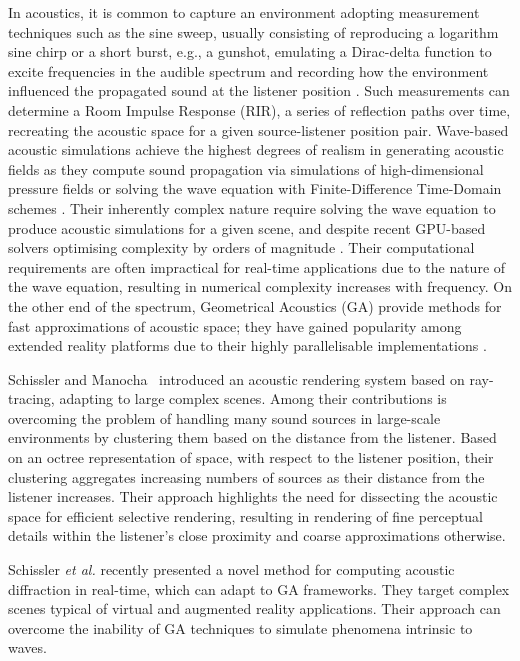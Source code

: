 In acoustics, it is common to capture an environment adopting measurement techniques such as the sine sweep, usually consisting of reproducing a logarithm sine chirp or a short burst, e.g., a gunshot,  emulating a Dirac-delta function to excite frequencies in the audible spectrum and recording how the environment influenced the propagated sound at the listener position \cite{reilly1995convolution}. Such measurements can determine a Room Impulse Response (RIR), a series of reflection paths over time, recreating the acoustic space for a given source-listener position pair. Wave-based acoustic simulations achieve the highest degrees of realism in generating acoustic fields as they compute sound propagation via simulations of high-dimensional pressure fields \cite{raghuvanshi2014parametric} or solving the wave equation with Finite-Difference Time-Domain schemes \cite{hamilton2017fdtd}. Their inherently complex nature require solving the wave equation to produce acoustic simulations for a given scene, and despite recent GPU-based solvers optimising complexity by orders of magnitude \cite{mehra2012efficient}. Their computational requirements are often impractical for real-time applications due to the nature of the wave equation, resulting in numerical complexity increases with frequency. On the other end of the spectrum, Geometrical Acoustics (GA) provide methods for fast approximations of acoustic space; they have gained popularity among extended reality platforms due to their highly parallelisable implementations \cite{savioja2015overview}.\par
Schissler and Manocha~\cite{schissler2016interactive} introduced an acoustic rendering system based on ray-tracing, adapting to large complex scenes. Among their contributions is overcoming the problem of handling many sound sources in large-scale environments by clustering them based on the distance from the listener. Based on an octree representation of space, with respect to the listener position, their clustering aggregates increasing numbers of sources as their distance from the listener increases. Their approach highlights the need for dissecting the acoustic space for efficient selective rendering, resulting in rendering of fine perceptual details within the listener's close proximity and coarse approximations otherwise. \par

Schissler \textit{et al.} \cite{schissler2021fast} recently presented a novel method for computing acoustic diffraction in real-time, which can adapt to GA frameworks. They target complex scenes typical of virtual and augmented reality applications. Their approach can overcome the inability of GA techniques to simulate phenomena intrinsic to waves.\par

